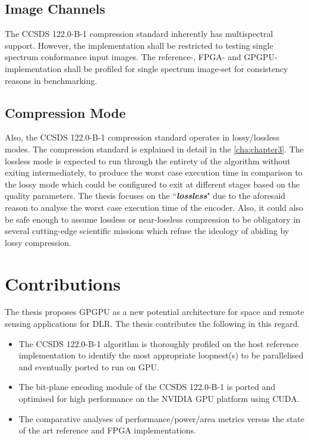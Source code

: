 \subsection{Image Channels}
The \gls{CCSDS} 122.0-B-1 compression standard inherently has multispectral support. However, the implementation shall be restricted to testing single spectrum conformance input images. The reference-, \gls{FPGA}- and \gls{GPGPU}-implementation shall be profiled for single spectrum image-set for consistency reasons in benchmarking.
\subsection{Compression Mode}
Also, the \gls{CCSDS} 122.0-B-1 compression standard operates in lossy/lossless modes. The compression standard is explained in detail in the \autoref{cha:chapter3}. The lossless mode is expected to run through the entirety of the algorithm without exiting intermediately, to produce the worst case execution time in comparison to the lossy mode which could be configured to exit at different stages based on the quality parameters. The thesis focuses on the ``\textbf{\textit{lossless}}" due to the aforesaid reason to analyse the worst case execution time of the encoder. Also, it could also be safe enough to assume lossless or near-lossless compression to be obligatory in several cutting-edge scientific missions which refuse the ideology of abiding by lossy compression.

\section{Contributions\label{sec:contributions}}
The thesis proposes \gls{GPGPU} as a new potential architecture for space and remote sensing applications for DLR. The thesis contributes the following in this regard.
\begin{itemize}
  \item The \gls{CCSDS} 122.0-B-1 algorithm is thoroughly profiled on the host reference implementation to identify the most appropriate loopnest(s) to be parallelised and eventually ported to run on GPU.
  \item The bit-plane encoding module of the \gls{CCSDS} 122.0-B-1 is ported and optimised for high performance on the NVIDIA \gls{GPU} platform using \gls{CUDA}.
  \item The comparative analyses of performance/power/area metrics versus the state of the art reference and \gls{FPGA} implementations.
\end{itemize}
